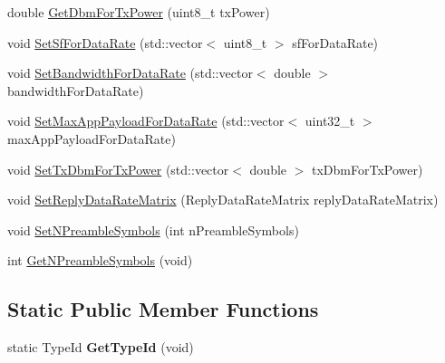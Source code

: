 \begin{DoxyCompactItemize}
\item 
double \hyperlink{classns3_1_1lorawan_1_1LoraMac_a9c94b957556a38e2d1eba4a6d95121fe}{Get\+Dbm\+For\+Tx\+Power} (uint8\+\_\+t tx\+Power)
\item 
void \hyperlink{classns3_1_1lorawan_1_1LoraMac_a54d20add4e60e76ad45bd34a95fce0c2}{Set\+Sf\+For\+Data\+Rate} (std\+::vector$<$ uint8\+\_\+t $>$ sf\+For\+Data\+Rate)
\item 
void \hyperlink{classns3_1_1lorawan_1_1LoraMac_a7b915e6aa7ec36d1ac2581526afd652c}{Set\+Bandwidth\+For\+Data\+Rate} (std\+::vector$<$ double $>$ bandwidth\+For\+Data\+Rate)
\item 
void \hyperlink{classns3_1_1lorawan_1_1LoraMac_aba1762b2acb3cc7113e499106bd54cb9}{Set\+Max\+App\+Payload\+For\+Data\+Rate} (std\+::vector$<$ uint32\+\_\+t $>$ max\+App\+Payload\+For\+Data\+Rate)
\item 
void \hyperlink{classns3_1_1lorawan_1_1LoraMac_a398100d19be0294f87f7c102f8ff141b}{Set\+Tx\+Dbm\+For\+Tx\+Power} (std\+::vector$<$ double $>$ tx\+Dbm\+For\+Tx\+Power)
\item 
void \hyperlink{classns3_1_1lorawan_1_1LoraMac_a669d1029ecf8039e040df55a5806cd5b}{Set\+Reply\+Data\+Rate\+Matrix} (Reply\+Data\+Rate\+Matrix reply\+Data\+Rate\+Matrix)
\item 
void \hyperlink{classns3_1_1lorawan_1_1LoraMac_a26b6522eed72c69ebbac6a178521aeb0}{Set\+N\+Preamble\+Symbols} (int n\+Preamble\+Symbols)
\item 
int \hyperlink{classns3_1_1lorawan_1_1LoraMac_a8c731405d8a33467119060a3669b4105}{Get\+N\+Preamble\+Symbols} (void)
\end{DoxyCompactItemize}
\subsection*{Static Public Member Functions}
\begin{DoxyCompactItemize}
\item 
\mbox{\label{classns3_1_1lorawan_1_1LoraMac_a9b0bc1ebadb5c5c41b14ad33e6d30f84}} 
static Type\+Id {\bfseries Get\+Type\+Id} (void)
\end{DoxyCompactItemize}
